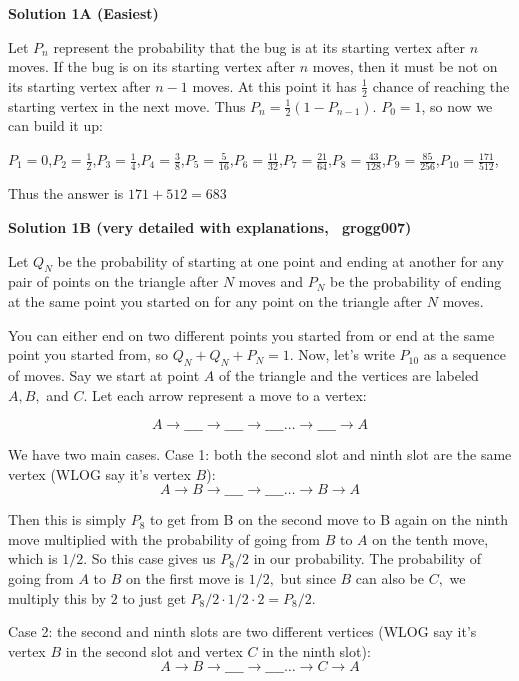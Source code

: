 \begin{enumerate}
\textbf{Solution 1A (Easiest)}

Let $P_n$ represent the probability that the bug is at its starting vertex after $n$ moves. If the bug is on its starting vertex after $n$ moves, then it must be not on its starting vertex after $n-1$ moves. At this point it has $\frac{1}{2}$ chance of reaching the starting vertex in the next move. Thus $P_n=\frac{1}{2}(1-P_{n-1})$. $P_0=1$, so now we can build it up:

 $P_1=0$,$P_2=\frac{1}{2}$,$P_3=\frac{1}{4}$,$P_4=\frac{3}{8}$,$P_5=\frac{5}{16}$,$P_6=\frac{11}{32}$,$P_7=\frac{21}{64}$,$P_8=\frac{43}{128}$,$P_9=\frac{85}{256}$,$P_{10}=\frac{171}{512}$,

 Thus the answer is $171+512=$$\boxed{683}$




\textbf{Solution 1B (very detailed with explanations, ~grogg007)}

Let $Q_{N}$ be the probability of starting at one point and ending at another for any pair of points on the triangle after $N$ moves and $P_{N}$ be the probability of ending at the same point you started on for any point on the triangle after $N$ moves. 

 You can either end on two different points you started from or end at the same point you started from, so $Q_{N} + Q_{N} + P_{N} = 1.$ Now, let's write $P_{10}$ as a sequence of moves. Say we start at point $A$ of the triangle and the vertices are labeled $A, B,$ and $C.$ Let each arrow represent a move to a vertex:

 
 \[A \rightarrow \_\_\_\_ \rightarrow \_\_\_\_ \rightarrow \_\_\_\_ \dots \rightarrow \_\_\_\_ \rightarrow A\]

 We have two main cases. Case 1: both the second slot and ninth slot are the same vertex (WLOG say it's vertex $B$): 
 \[A \rightarrow B \rightarrow \_\_\_\_ \rightarrow \_\_\_\_ \dots \rightarrow B \rightarrow A\]

 Then this is simply $P_{8}$ to get from B on the second move to B again on the ninth move multiplied with the probability of going from $B$ to $A$ on the tenth move, which is $1/2.$ So this case gives us $P_{8}/2$ in our probability. The probability of going from $A$ to $B$ on the first move is $1/2,$ but since $B$ can also be $C,$ we multiply this by $2$ to just get $P_{8}/2 \cdot 1/2 \cdot 2 = P_{8}/2$.

 Case 2: the second and ninth slots are two different vertices (WLOG say it's vertex $B$ in the second slot and vertex $C$ in the ninth slot):
 \[A \rightarrow B \rightarrow \_\_\_\_ \rightarrow \_\_\_\_ \dots \rightarrow C \rightarrow A\]


\end{enumerate}
